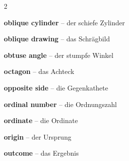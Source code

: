 \begin{multicols}{2}
\par\nopagebreak
\textbf{oblique cylinder} -- der schiefe Zylinder\dotfill\hyperref[e:238]{\pageref*{e:238}}\par
\textbf{oblique drawing} -- das Schrägbild\dotfill\hyperref[e:254]{\pageref*{e:254}}\par
\textbf{obtuse angle} -- der stumpfe Winkel\dotfill\hyperref[e:159]{\pageref*{e:159}}\par
\textbf{octagon} -- das Achteck\dotfill\hyperref[e:207]{\pageref*{e:207}}\par
\textbf{opposite side} -- die Gegenkathete\dotfill\hyperref[e:189]{\pageref*{e:189}}\par
\textbf{ordinal number} -- die Ordnungszahl\dotfill\hyperref[e:3]{\pageref*{e:3}}\par
\textbf{ordinate} -- die Ordinate\dotfill\hyperref[e:118]{\pageref*{e:118}}\par
\textbf{origin} -- der Ursprung\dotfill\hyperref[e:115]{\pageref*{e:115}}\par
\textbf{outcome} -- das Ergebnis\dotfill\hyperref[e:327]{\pageref*{e:327}}\par


\end{multicols}
